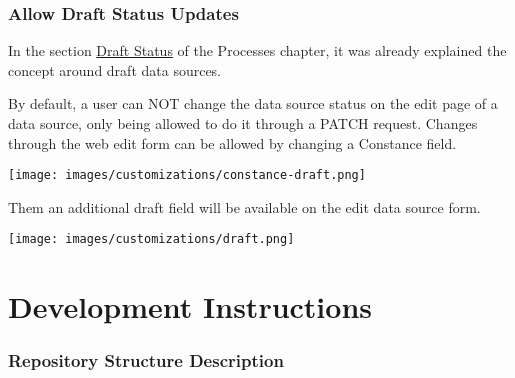 \documentclass[
]{book}
\begin{document}
\hypertarget{allow-draft-status-updates}{%
\subsection*{Allow Draft Status Updates}\label{allow-draft-status-updates}}

In the section \href{processes.html\#draft-status}{Draft Status} of the Processes chapter, it was already explained the concept around draft data sources.

By default, a user can NOT change the data source status on the edit page of a data source, only being allowed to do it through a PATCH request.
Changes through the web edit form can be allowed by changing a Constance field.

\texttt{[image: images/customizations/constance-draft.png]}

Them an additional draft field will be available on the edit data source form.

\texttt{[image: images/customizations/draft.png]}

\hypertarget{development-instructions}{%
\chapter{Development Instructions}\label{development-instructions}}

\hypertarget{repository-structure-description}{%
\subsection*{Repository Structure Description}\label{repository-structure-description}}
\end{document}
